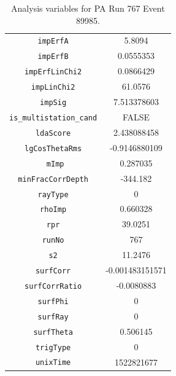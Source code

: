 \begin{table}
\begin{tabular}{cc}
            \texttt{impErfA} & 5.8094 \\
            \texttt{impErfB} & 0.0555353 \\
            \texttt{impErfLinChi2} & 0.0866429 \\
            \texttt{impLinChi2} & 61.0576 \\
            \texttt{impSig} & 7.513378603 \\
            \texttt{is\_multistation\_cand} & FALSE \\
            \texttt{ldaScore} & 2.438088458 \\
            \texttt{lgCosThetaRms} & -0.9146880109 \\
            \texttt{ mImp} & 0.287035 \\
            \texttt{minFracCorrDepth} & -344.182 \\
            \texttt{rayType} & 0 \\
            \texttt{rhoImp} & 0.660328 \\
            \texttt{rpr} & 39.0251 \\
            \texttt{runNo} & 767 \\
            \texttt{s2} & 11.2476 \\
            \texttt{surfCorr} & -0.001483151571 \\
            \texttt{surfCorrRatio} & -0.0080883 \\
            \texttt{surfPhi} & 0 \\
            \texttt{surfRay} & 0 \\
            \texttt{surfTheta} & 0.506145 \\
            \texttt{trigType} & 0 \\
            \texttt{unixTime} & 1522821677 \\
        \end{tabular}
        \caption{Analysis variables for PA Run 767 Event 89985.}
        \label{tab:pa_passingevent}
    \end{table}